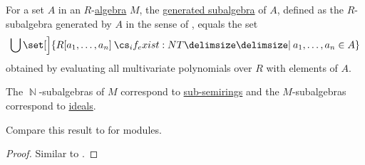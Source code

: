 \begin{proposition}\label{thm:generators_via_polynomials}
  For a set \( A \) in an \( R \)-\hyperref[def:algebra_over_semiring]{algebra} \( M \), the \hyperref[def:algebra_over_semiring/submodel]{generated subalgebra} of \( A \), defined as the \( R \)-subalgebra generated by \( A \) in the sense of , equals the set
  \begin{equation*}
    \bigcup \set[\Big]{ R[a_1, \ldots, a_n] \given* a_1, \ldots, a_n \in A }
  \end{equation*}
  obtained by evaluating all multivariate polynomials over \( R \) with elements of \( A \).

  The \( \BbbN \)-subalgebras of \( M \) correspond to \hyperref[def:semiring/submodel]{sub-semirings} and the \( M \)-subalgebras correspond to \hyperref[def:semiring_ideal/generated]{ideals}.

  Compare this result to  for modules.
\end{proposition}
\begin{proof}
  Similar to .
\end{proof}
